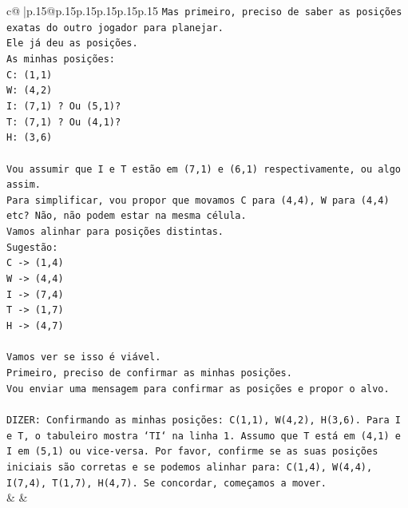 \documentclass{article}
\begin{document}
{\begin{supertabular}{c@{$\;$}|p{.15\linewidth}@{}p{.15\linewidth}p{.15\linewidth}p{.15\linewidth}p{.15\linewidth}p{.15\linewidth}}
{{{\texttt{Mas primeiro, preciso de saber as posições exatas do outro jogador para planejar.} \\
\texttt{Ele já deu as posições.} \\
\texttt{As minhas posições:} \\
\texttt{C: (1,1)} \\
\texttt{W: (4,2)} \\
\texttt{I: (7,1) ? Ou (5,1)?} \\
\texttt{T: (7,1) ? Ou (4,1)?} \\
\texttt{H: (3,6)} \\
\\ 
\texttt{Vou assumir que I e T estão em (7,1) e (6,1) respectivamente, ou algo assim.} \\
\texttt{Para simplificar, vou propor que movamos C para (4,4), W para (4,4) etc? Não, não podem estar na mesma célula.} \\
\texttt{Vamos alinhar para posições distintas.} \\
\texttt{Sugestão:} \\
\texttt{C {-}> (1,4)} \\
\texttt{W {-}> (4,4)} \\
\texttt{I {-}> (7,4)} \\
\texttt{T {-}> (1,7)} \\
\texttt{H {-}> (4,7)} \\
\\ 
\texttt{Vamos ver se isso é viável.} \\
\texttt{Primeiro, preciso de confirmar as minhas posições.} \\
\texttt{Vou enviar uma mensagem para confirmar as posições e propor o alvo.} \\
\\ 
\texttt{DIZER: Confirmando as minhas posições: C(1,1), W(4,2), H(3,6). Para I e T, o tabuleiro mostra `TI` na linha 1. Assumo que T está em (4,1) e I em (5,1) ou vice{-}versa. Por favor, confirme se as suas posições iniciais são corretas e se podemos alinhar para: C(1,4), W(4,4), I(7,4), T(1,7), H(4,7). Se concordar, começamos a mover.} \\
            }
        }
    }
    & & \\ \\


\end{supertabular}}
\end{document}
